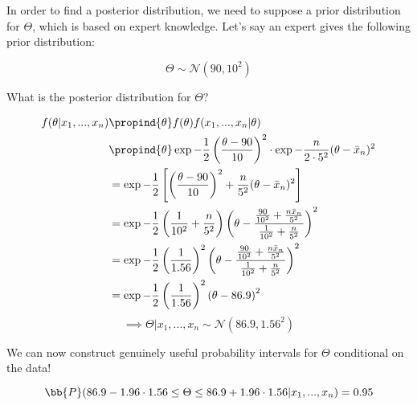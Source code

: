 \documentclass[a4paper]{article}
\begin{document}
                In order to find a posterior distribution, we need to suppose a
                prior distribution for $\Theta$, which is based on expert
                knowledge. Let's say an expert gives the following prior
                distribution:

                \[
                    \Theta \sim \mathcal{N}(90, 10^2)
                \]

                What is the posterior distribution for $\Theta$?

                \begin{align*}
                    f(\theta | x_1, ..., x_n) & \propind{\theta} f(\theta)
                        f(x_1, ..., x_n | \theta) \\
                    & \propind{\theta} \exp{-\frac{1}{2}\left(\frac{\theta - 90}
                        {10}\right)^2} \cdot \exp{-\frac{n}{2 \cdot 5^2}(\theta
                        - \bar x_n)^2} \\
                    & = \exp{-\frac{1}{2}\left[\left(\frac{\theta - 90}{10}
                        \right)^2 + \frac{n}{5^2}(\theta - \bar x_n)^2\right]}
                        \\
                    & = \exp{-\frac{1}{2}\left(\frac{1}{10^2} + \frac{n}{5^2}
                        \right)\left(\theta - \frac{\frac{90}{10^2} + \frac{n
                        \bar x_n}{5^2}}{\frac{1}{10^2} + \frac{n}{5^2}}\right)^2
                        } \\
                    & = \exp{-\frac{1}{2}\left(\frac{1}{1.56}\right)^2\left(
                        \theta - \frac{\frac{90}{10^2} + \frac{n \bar x_n}{5^2}}
                        {\frac{1}{10^2} + \frac{n}{5^2}}\right)^2} \\
                    & = \exp{-\frac{1}{2}\left(\frac{1}{1.56}\right)^2\left(
                        \theta - 86.9\right)^2} \\
                \end{align*}
                \[
                    \implies \Theta | x_1, ..., x_n \sim \mathcal{N}(86.9,
                    1.56^2)
                \]

                We can now construct genuinely useful probability intervals for
                $\Theta$ conditional on the data!

                \[
                    \bb{P}(86.9 - 1.96 \cdot 1.56 \leq \Theta \leq 86.9 + 1.96
                    \cdot 1.56 | x_1, ..., x_n) = 0.95
                \]
\end{document}
